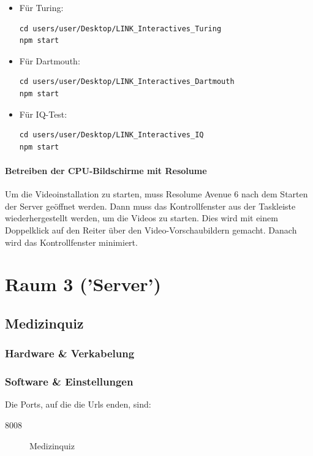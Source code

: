 \documentclass [titlepage,a4paper]{article}
\begin{document}
\begin{itemize}
\item Für Turing: \begin{verbatim}
cd users/user/Desktop/LINK_Interactives_Turing
npm start
\end{verbatim}
\item Für Dartmouth: \begin{verbatim}
cd users/user/Desktop/LINK_Interactives_Dartmouth
npm start
\end{verbatim}
\item Für IQ-Test: \begin{verbatim}
cd users/user/Desktop/LINK_Interactives_IQ
npm start
\end{verbatim}
\end{itemize}

\paragraph{Betreiben der CPU-Bildschirme mit Resolume}

Um die Videoinstallation zu starten, muss Resolume Avenue 6 nach dem Starten der Server geöffnet werden. Dann muss das Kontrollfenster aus der Taskleiste wiederhergestellt werden, um die Videos zu starten. Dies wird mit einem Doppelklick auf den Reiter über den Video-Vorschaubildern gemacht. Danach wird das Kontrollfenster minimiert.


\newpage
\section{Raum 3 ('Server')}

\subsection{Medizinquiz}

\subsubsection{Hardware \& Verkabelung}

\subsubsection{Software \& Einstellungen}

Die Ports, auf die die Urls enden, sind: \begin{description}
    \item[8008] Medizinquiz
\end{description}
\end{document}
